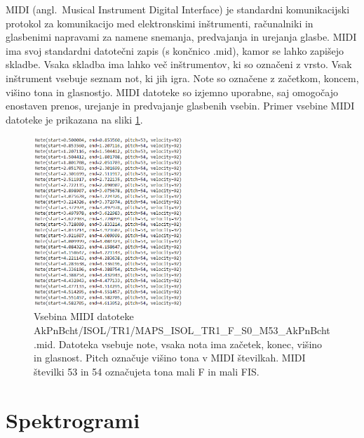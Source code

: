\documentclass[a4paper, 12pt, openright]{book}
\newcommand{\en}{angl.}
\begin{document}
MIDI (\en\ Musical Instrument Digital Interface) je standardni komunikacijski protokol za komunikacijo med elektronskimi inštrumenti, računalniki in glasbenimi napravami za namene snemanja, predvajanja in urejanja glasbe.
MIDI ima svoj standardni datotečni zapis (s končnico .mid), kamor se lahko zapišejo skladbe.
Vsaka skladba ima lahko več inštrumentov, ki so označeni z vrsto.
Vsak inštrument vsebuje seznam not, ki jih igra.
Note so označene z začetkom, koncem, višino tona in glasnostjo.
MIDI datoteke so izjemno uporabne, saj omogočajo enostaven prenos, urejanje in predvajanje glasbenih vsebin.
Primer vsebine MIDI datoteke je prikazana na sliki \ref{fig:midi}.

\begin{figure}
    \centering
    \includegraphics[width=0.5\textwidth]{slike/midi_file.png}
    \caption{Vsebina MIDI datoteke \\ AkPnBcht/ISOL/TR1/MAPS\_ISOL\_TR1\_F\_S0\_M53\_AkPnBcht.mid. Datoteka vsebuje note, vsaka nota ima začetek, konec, višino in glasnost. Pitch označuje višino tona v MIDI številkah. MIDI številki 53 in 54 označujeta tona mali F in mali FIS.}
    \label{fig:midi}
\end{figure}

\section{Spektrogrami}
\end{document}
